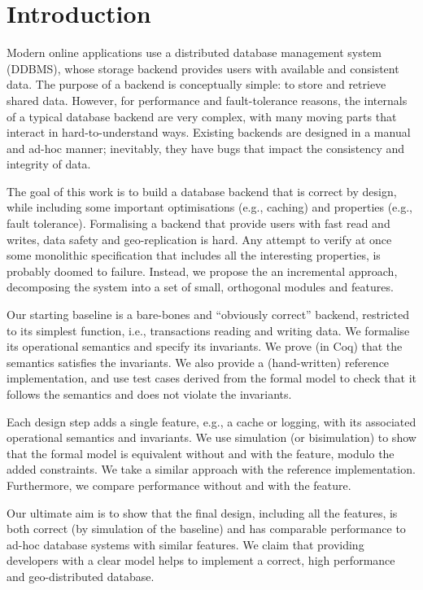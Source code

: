 \documentclass[systeme,french,english]{compas2022}
\begin{document}
\section{Introduction}

Modern online applications use a distributed database management system
(DDBMS), whose storage backend provides users with available and
consistent data.
The purpose of a backend is conceptually simple: to store and retrieve
shared data.
However, for performance and fault-tolerance reasons, the internals of a
typical database backend are very complex, with many moving parts that interact
in hard-to-understand ways.
Existing backends are designed in a manual and ad-hoc manner;
inevitably, they have bugs that impact the consistency and integrity of
data.

The goal of this work is to build a database backend that is correct by
design, while including some important optimisations (e.g., caching) and
properties (e.g., fault tolerance).
Formalising a backend that provide users with fast read and writes,
data safety and geo-replication is hard.
Any attempt to verify at once some monolithic specification that
includes all the interesting properties, is probably doomed to failure.
Instead, we propose the an incremental approach,  decomposing the
system into a set of small, orthogonal modules and features.

Our starting baseline is a bare-bones and ``obviously correct'' backend,
restricted to its simplest function, i.e., transactions reading and
writing data.
We formalise its operational semantics and specify its invariants.
We prove (in Coq) that the semantics satisfies the invariants.
We also provide a (hand-written) reference implementation, and use test
cases derived from the formal model to check that it follows the
semantics and does not violate the invariants.

Each design step adds a single feature, e.g., a cache or logging,
with its associated operational semantics and invariants.
We use simulation (or bisimulation) to show that the formal model is
equivalent without and with the feature, modulo the added constraints.
We take a similar approach with the reference implementation.
Furthermore, we compare performance without and with the feature.

Our ultimate aim is to show that the final design, including all the
features, is both correct (by simulation of the baseline) and has
comparable performance to ad-hoc database systems with similar features.
We claim that providing developers with a clear model helps to implement
a correct, high performance and geo-distributed database.
\end{document}
